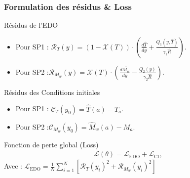 \documentclass[handout]{beamer}
\newtheorem{pbm et hypo}[thm]{Problématique et hypothèses}
\begin{document}
	
	\begin{frame}
		\frametitle{Formulation des résidus \& Loss}
		\begin{block}{Résidus de l'EDO}\pause
			\vspace{-1ex}
			\begin{itemize}
				\item Pour SP1 : 	$\mathcal{R}_T(y) = \left(1-\mathcal{X}(T)\right)\cdot\left(\frac{d\hat{T}}{dy} + \frac{Q_1(y, \hat{T})}{\gamma_1 \hat{R}}\right)$.\pause
				\item Pour SP2 :$ \mathcal{R}_{M_w}(y) = \mathcal{X}(T)\cdot\left(\frac{d\hat{M_w}}{dy} - \frac{Q_2(y)}{\gamma_2 \hat{R}}\right)$.
			\end{itemize}\pause
		\end{block}
		
		\begin{block}{Résidus des Conditions initiales}\pause
			\vspace{-1ex}
			\begin{itemize}
				\item Pour SP1 : $\mathcal{C}_T(y_0) = \hat{T}(a) - T_{a}$.\pause
				\item Pour SP2 :$\mathcal{C}_{M_w} (y_0) = \hat{M}_w(a) - M_{a}  $.
			\end{itemize}\pause
		\end{block}
		
		\begin{block}{Fonction de perte global (Loss)} \pause 
			\vspace{-3 ex}
			\begin{align}
				\mathcal{L}(\theta) = \mathcal{L}_{\text{EDO}} + \mathcal{L}_{\text{CI}}, 
			\end{align}\pause
			Avec : $ \mathcal{L}_{\text{EDO}}= \frac{1}{N}\sum_{i=1}^{N}\left[\mathcal{R}_T(y_i)^2 +  \mathcal{R}_{M_w}(y_i)^2\right]$
		\end{block}
	\end{frame}
	
	
	
	
\end{document}
